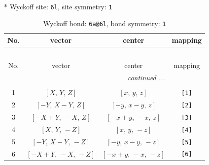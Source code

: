\documentclass[fleqn,8pt]{jsarticle}
\begin{document}
* Wyckoff site: {\tt 6l}, site symmetry: {\tt 1}
\renewcommand{\arraystretch}{1.2}
\begin{longtable}{cccc}
\caption{Wyckoff bond: {\tt 6a@6l}, bond symmetry: {\tt 1}}
 \\
 \hline \hline
No. & vector & center & mapping \\ \hline \endfirsthead

\multicolumn{3}{l}{\tablename\ \thetable{}} \\
 \hline \hline
No. & vector & center & mapping \\ \hline \endhead

 \hline \hline
\multicolumn{3}{r}{\footnotesize\it continued ...} \\ \endfoot

 \hline \hline
\multicolumn{3}{r}{} \\ \endlastfoot

1 & $\left[ X,\, Y,\, Z \right]$ & $\left[ x,\, y,\, z \right]$ & {\tt [1]} \\ \hline
2 & $\left[ - Y,\, X - Y,\, Z \right]$ & $\left[ - y,\, x - y,\, z \right]$ & {\tt [2]} \\ \hline
3 & $\left[ - X + Y,\, - X,\, Z \right]$ & $\left[ - x + y,\, - x,\, z \right]$ & {\tt [3]} \\ \hline
4 & $\left[ X,\, Y,\, - Z \right]$ & $\left[ x,\, y,\, - z \right]$ & {\tt [4]} \\ \hline
5 & $\left[ - Y,\, X - Y,\, - Z \right]$ & $\left[ - y,\, x - y,\, - z \right]$ & {\tt [5]} \\ \hline
6 & $\left[ - X + Y,\, - X,\, - Z \right]$ & $\left[ - x + y,\, - x,\, - z \right]$ & {\tt [6]} \\
\end{longtable}
\end{document}
